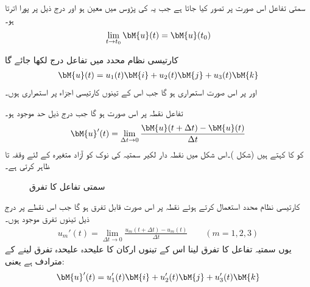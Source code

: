 سمتی تفاعل  اس صورت  پر  تصور کیا جاتا ہے جب یہ  کی پڑوس میں معین ہو اور درج ذیل پر پورا اترتا ہو۔
\begin{align}
\lim_{t\to t_0} \bM{u}(t)=\bM{u}(t_0)
\end{align}

کارتیسی نظام محدد میں تفاعل  درج لکھا جائے گا
\begin{align}
\bM{u}(t)=u_1(t)\bM{i}+u_2(t)\bM{j}+u_3(t)\bM{k}
\end{align}
اور  پر  اس صورت استمراری ہو گا جب اس کے تینوں کارتیسی اجزاء  پر استمراری ہوں۔

تفاعل  نقطہ  پر اس صورت  ہو گا جب  درج ذیل حد موجود ہو۔
\begin{align}
\bM{u}'(t)=\lim_{\Delta t\to 0} \frac{\bM{u}(t+\Delta t)-\bM{u}(t)}{\Delta t}
\end{align}
 کو  کا  کہتے ہیں (شکل )۔اس شکل  میں نقطہ دار لکیر سمتیہ  کی نوک کو  آزاد متغیرہ  کے لئے وقفہ     تا  ظاہر کرتی ہے۔
\begin{figure}
\centering
{}
\caption{سمتی تفاعل کا تفرق}
\label{شکل_الاحصاء_سمتی_تفاعل_تفرق}
\end{figure}

کارتیسی نظام محدد استعمال کرتے ہوئے نقطہ   پر  اس صورت قابل تفرق ہو گا جب اس نقطے پر درج ذیل تینوں تفرق موجود ہوں۔
\begin{align*}
u_m'(t)=\lim_{\Delta t\to 0}\frac{u_m(t+\Delta t)-u_m(t)}{\Delta t} \quad \quad (m=1,2,3)
\end{align*}
یوں سمتیہ تفاعل کا تفرق لینا اس کے تینوں ارکان کا علیحدہ علیحدہ تفرق لینے کے مترادف ہے یعنی:
\begin{align}
\bM{u}'(t)=u_1'(t)\bM{i}+u_2'(t)\bM{j}+u_3'(t)\bM{k}
\end{align}

